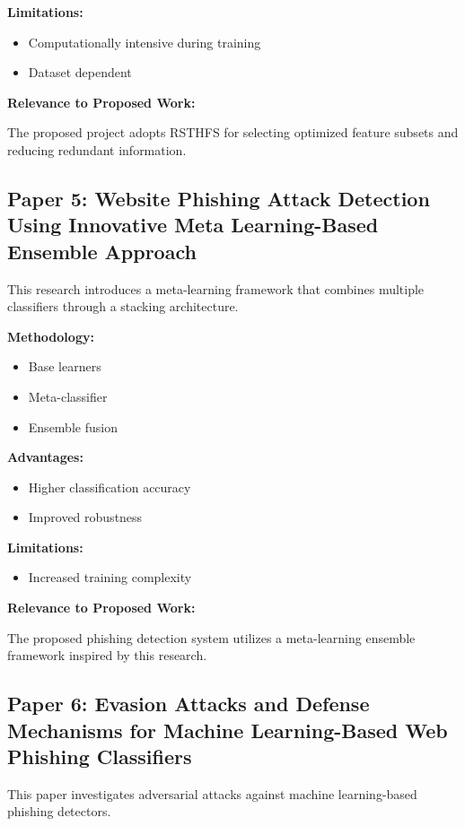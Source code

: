 \documentclass[12pt]{report}
\begin{document}
\textbf{Limitations:}
\begin{itemize}
    \item Computationally intensive during training
    \item Dataset dependent
\end{itemize}

\textbf{Relevance to Proposed Work:}

The proposed project adopts RSTHFS for selecting optimized feature subsets and reducing redundant information.

\subsection{Paper 5: Website Phishing Attack Detection Using Innovative Meta Learning-Based Ensemble Approach}

This research introduces a meta-learning framework that combines multiple classifiers through a stacking architecture.

\textbf{Methodology:}
\begin{itemize}
    \item Base learners
    \item Meta-classifier
    \item Ensemble fusion
\end{itemize}

\textbf{Advantages:}
\begin{itemize}
    \item Higher classification accuracy
    \item Improved robustness
\end{itemize}

\textbf{Limitations:}
\begin{itemize}
    \item Increased training complexity
\end{itemize}

\textbf{Relevance to Proposed Work:}

The proposed phishing detection system utilizes a meta-learning ensemble framework inspired by this research.

\subsection{Paper 6: Evasion Attacks and Defense Mechanisms for Machine Learning-Based Web Phishing Classifiers}

This paper investigates adversarial attacks against machine learning-based phishing detectors.
\end{document}
